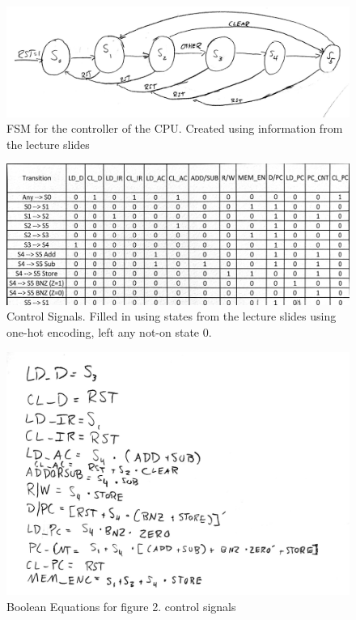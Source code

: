 \documentclass[12pt]{article}
\begin{document}
		\begin{figure}[h]
			\includegraphics[scale=.18]{Prelab1.jpg}
			\caption{FSM for the controller of the CPU. Created using information from the lecture slides}
		\end{figure}
		\begin{figure}[h]
			\includegraphics[scale=.15]{Prelab2.jpg}
			\caption{Control Signals. Filled in using states from the lecture slides using one-hot encoding, left any not-on state 0.}
		\end{figure}
		\newpage
		\begin{figure}[h]
			\includegraphics[scale=.2]{Prelab3.jpg}
			\caption{Boolean Equations for figure 2. control signals}
		\end{figure}
\end{document}
